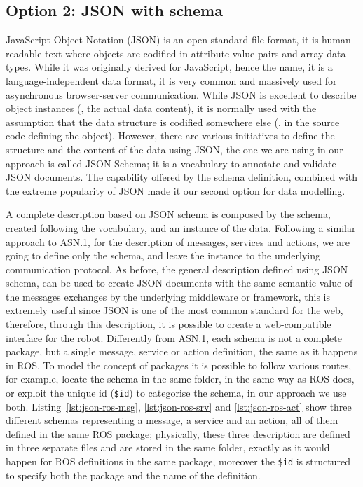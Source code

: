 \subsection{Option 2: JSON with schema}
 JavaScript Object Notation (JSON) is an open-standard file format, it is human readable text where objects are codified in attribute-value pairs and array data types. While it was originally derived for JavaScript, hence the name, it is a language-independent data format, it is very common and massively used for asynchronous browser-server communication. While JSON is excellent to describe object instances (\ie, the actual data content), it is normally used with the assumption that the data structure is codified somewhere else (\eg, in the source code defining the object). However, there are various initiatives to define the structure and the content of the data using JSON, the one we are using in our approach is called JSON Schema; it is a vocabulary to annotate and validate JSON documents. The capability offered by the schema definition, combined with the extreme popularity of JSON made it our second option for data modelling.
 
A complete description based on JSON schema is composed by the schema, created following the vocabulary, and an instance of the data. Following a similar approach to ASN.1, for the description of messages, services and actions, we are going to define only the schema, and leave the instance to the underlying communication protocol. As before, the general description defined using JSON schema, can be used to create JSON documents with the same semantic value of the messages exchanges by the underlying middleware or framework, this is extremely useful since JSON is one of the most common standard for the web, therefore, through this description, it is possible to create a web-compatible interface for the robot. Differently from ASN.1, each schema is not a complete package, but a single message, service or action definition, the same as it happens in ROS. To model the concept of packages it is possible to follow various routes, for example, locate the schema in the same folder, in the same way as ROS does, or exploit the unique id (\texttt{\$id}) to categorise the schema, in our approach we use both. Listing~\ref{lst:json-ros-msg}, \ref{lst:json-ros-srv} and \ref{lst:json-ros-act} show three different schemas representing a message, a service and an action, all of them defined in the same ROS package; physically, these three description are defined in three separate files and are stored in the same folder, exactly as it would happen for ROS definitions in the same package, moreover the \texttt{\$id} is structured to specify both the package and the name of the definition.


